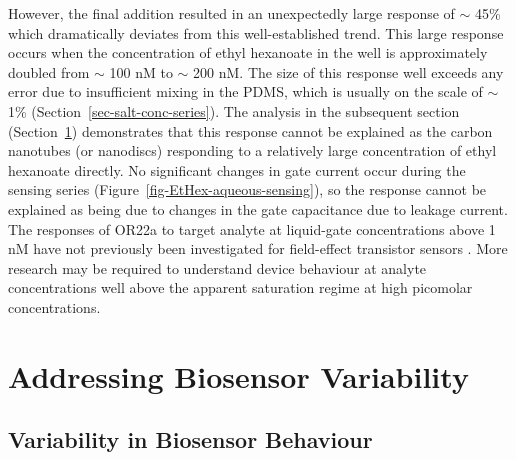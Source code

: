 \documentclass[
  a4paper,
]{scrbook}
\begin{document}
However, the final addition resulted in an unexpectedly large response
of \(\sim\) 45\% which dramatically deviates from this well-established
trend. This large response occurs when the concentration of ethyl
hexanoate in the well is approximately doubled from \(\sim\) 100 nM to
\(\sim\) 200 nM. The size of this response well exceeds any error due to
insufficient mixing in the PDMS, which is usually on the scale of
\(\sim\) 1\% (Section~\ref{sec-salt-conc-series}). The analysis in the
subsequent section (Section~\ref{sec-variability}) demonstrates that
this response cannot be explained as the carbon nanotubes (or nanodiscs)
responding to a relatively large concentration of ethyl hexanoate
directly. No significant changes in gate current occur during the
sensing series (Figure~\ref{fig-EtHex-aqueous-sensing}), so the response
cannot be explained as being due to changes in the gate capacitance due
to leakage current. The responses of OR22a to target analyte at
liquid-gate concentrations above 1 nM have not previously been
investigated for field-effect transistor sensors
\autocite{Murugathas2019a,Murugathas2020}. More research may be required
to understand device behaviour at analyte concentrations well above the
apparent saturation regime at high picomolar concentrations.

\hypertarget{sec-variability}{%
\section{Addressing Biosensor Variability}\label{sec-variability}}

\hypertarget{sec-variability-biosensor}{%
\subsection{Variability in Biosensor
Behaviour}\label{sec-variability-biosensor}}
\end{document}
